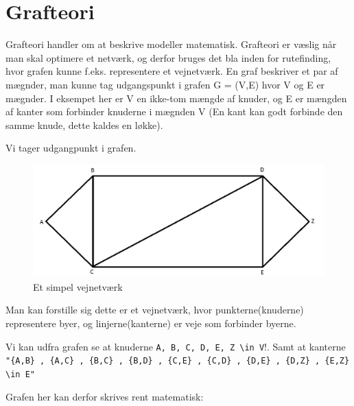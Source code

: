 \section{Grafteori}

Grafteori handler om at beskrive  modeller matematisk. Grafteori er væslig når man skal optimere et netværk, og derfor bruges det bla inden for rutefinding, hvor grafen kunne f.eks. representere et vejnetværk. 
En graf beskriver et par af mægnder, man kunne tag udgangspunkt i grafen G = (V,E) hvor V og E er mægnder. I eksempet her er V en ikke-tom mængde af knuder, og E er mængden af kanter som forbinder knuderne i mægnden V (En kant kan godt forbinde den samme knude, dette kaldes en løkke). 

\vspace{5mm}

Vi tager udgangpunkt i grafen.

\begin{figure}[H]
\begin{adjustbox}{width=1.2\textwidth,center=\textwidth}
\centering
\includegraphics[width=1.2\textwidth]{Pictures/Teoriafsnit/Figurfiler/Grafteori_graf.png}
\end{adjustbox}
\caption{Et simpel vejnetværk}
\label{fig:grafteori}
\end{figure}

Man kan forstille sig dette er et vejnetværk, hvor punkterne(knuderne) representere byer, og linjerne(kanterne) er veje som forbinder byerne.

\vspace{5mm}

Vi kan udfra grafen se at knuderne \verb"A, B, C, D, E, Z \in V"!. Samt at kanterne \verb!"{A,B} , {A,C} , {B,C} , {B,D} , {C,E} , {C,D} , {D,E} , {D,Z} , {E,Z} \in E"!

\vspace{5mm}

Grafen her kan derfor skrives rent matematisk:

\vspace{5mm}

